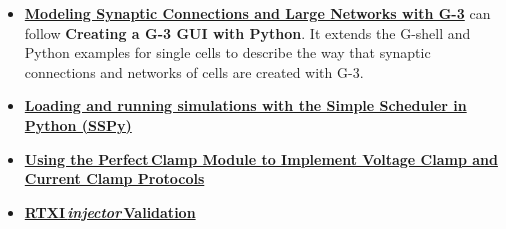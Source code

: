 \documentclass[12pt]{article}
\begin{document}
\begin{itemize}
   \item[]\href{../tutorial-networks/tutorial-networks.html}
          {\bf Modeling Synaptic Connections and Large Networks with G-3}
    can follow {\bf Creating a G-3 GUI with Python}.  It extends the
    G-shell and Python examples for single cells to describe the way that
    synaptic connections and networks of cells are created with G-3.

   \item[]\href{../sspy/sspy.tex}{\bf Loading and running simulations with the
 Simple Scheduler in Python (SSPy)}

   \item[]\href{../pclamp/pclamp.tex}{\bf Using the Perfect\,Clamp Module to Implement Voltage Clamp and Current Clamp Protocols}
   \item[]\href{../rtxi-injector-validation/rtxi-injector-validation.tex}{\bf RTXI\,{\it injector}\,Validation}
\end{itemize}
\end{document}

